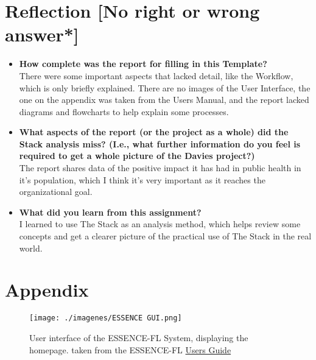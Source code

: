 \documentclass{article}
\begin{document}
\section{Reflection [No right or wrong answer*]} 
\begin{itemize}

\item{\textbf{How complete was the report for filling in this Template?}}\\
There were some important aspects that lacked detail, like the Workflow, which is only briefly explained. There are no images of the User Interface, the one on the appendix was taken from the Users Manual, and the report lacked diagrams and flowcharts to help explain some processes.

\item{\textbf{What aspects of the report (or the project as a whole) did the Stack analysis miss? (I.e., what further information do you feel is required to get a whole picture of the Davies project?)}}\\
The report shares data of the positive impact it has had in public health in it's population, which I think it's very important as it reaches the organizational  goal.

\item{\textbf{What did you learn from this assignment?}}\\
I learned to use The Stack as an analysis method, which helps review some concepts and get a clearer picture of the practical use of The Stack in the real world.
\end{itemize}
\pagebreak

\section{Appendix}
\begin{figure}[h]
  \texttt{[image: ./imagenes/ESSENCE GUI.png]}
  \caption{User interface of the ESSENCE-FL System, displaying the homepage. taken from the ESSENCE-FL \href{http://www.floridahealth.gov/diseases-and-conditions/disease-reporting-and-management/disease-reporting-and-surveillance/_documents/florida-essence-user-guide.pdf}{Users Guide} }
  \label{fig:boat1}
\end{figure}
\end{document}
